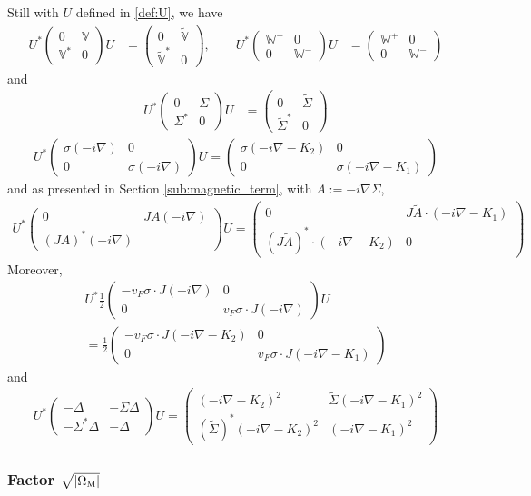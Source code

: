 \documentclass[11pt,a4paper,reqno,french,tikz]{amsart}
\newcommand{\pa}[1]{\left( #1 \right)} %
\newcommand{\ab}[1]{\left|#1\right|} %
\newcommand{\na}{\nabla} %
\newcommand{\f}[2]{\frac{#1}{#2}} %
\newcommand{\ind}[1]{_{\textup{#1}}} %
\newcommand{\mat}[1]{\begin{pmatrix} #1 \end{pmatrix}} %
\newcommand{\bbV}{\mathbb{V}}
\def\bbV{{\mathbb V}}
\def\bbW{{\mathbb W}}
\newcommand{\sqom}{\sqrt{\ab{\Omega\ind{M}}}}
\begin{document}
Still with $U$ defined in \eqref{def:U}, we have
\begin{align*}
U^* \mat{0 & \bbV \\ \bbV^* & 0} U &= \mat{0 & \widetilde{\bbV} \\ \widetilde{\bbV}^* & 0},\qquad U^* \mat{\bbW^+ & 0 \\ 0 & \bbW^-} U &= \mat{\bbW^+ & 0 \\ 0 & \bbW^-}
\end{align*}
and
\begin{align*}
U^* \mat{0 & \Sigma \\ \Sigma^* & 0} U &= \mat{0 & \widetilde{\Sigma} \\ \widetilde{\Sigma}^* & 0}
\end{align*}
\begin{align*}
	U^* \mat{\sigma \pa{-i\na} & 0 \\ 0 & \sigma \pa{-i\na}} U = \mat{\sigma \pa{-i\na - K_2} & 0 \\ 0 & \sigma \pa{-i\na- K_1}} 
\end{align*}
and as presented in Section \ref{sub:magnetic_term}, with $A := -i\na\Sigma$,
\begin{multline*}
	U^* \mat{0 & JA (-i\na) \\ \pa{JA}^* (-i\na)} U = \mat{0 & J \widetilde{A} \cdot(-i\na - K_1) \\  \pa{J\widetilde{A}}^* \cdot(-i\na - K_2) & 0}
\end{multline*}
Moreover,
\begin{multline*}
U^* \f 12 \mat{- v_F \sigma\cdot J(-i\na) & 0 \\ 0 & v_F \sigma\cdot J(-i\na)} U  \\
= \f 12 \mat{- v_F \sigma\cdot J(-i\na - K_2) & 0 \\ 0 & v_F \sigma\cdot J(-i\na - K_1)}
\end{multline*}
and
\begin{align*}
	U^*  \mat{ -\Delta & -\Sigma \Delta \\ - \Sigma^* \Delta & - \Delta} U = \mat{\pa{-i\na -K_2}^2 &  \widetilde{\Sigma} \pa{-i\na - K_1}^2 \\  \pa{\widetilde{\Sigma}}^* \pa{-i\na - K_2}^2 & \pa{-i\na -K_1}^2}
\end{align*}

\subsubsection{Factor $\sqom$}%
\label{ssub:factor_sqom_}
\end{document}
